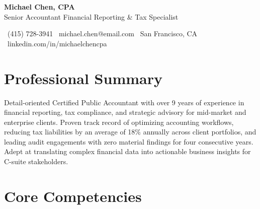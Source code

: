 \documentclass[11pt,letterpaper]{article}
\begin{document}

\vspace*{-0.15in}

\begin{center}
  \color{white}
  {\Huge\bfseries Michael Chen, CPA} \\[4pt]
  {\large Senior Accountant \textbar{} Financial Reporting \& Tax Specialist}
\end{center}

\vspace{0.1in}

\begin{center}
  \small
  \faPhone\ (415) 728-3941 \hspace{14pt}
  \faEnvelope\ michael.chen@email.com \hspace{14pt}
  \faMapMarker*\ San Francisco, CA \hspace{14pt}
  \faLinkedinIn\ linkedin.com/in/michaelchencpa
\end{center}

\vspace{2pt}

\section{Professional Summary}

Detail-oriented Certified Public Accountant with over 9 years of experience in financial reporting, tax compliance, and strategic advisory for mid-market and enterprise clients. Proven track record of optimizing accounting workflows, reducing tax liabilities by an average of 18\% annually across client portfolios, and leading audit engagements with zero material findings for four consecutive years. Adept at translating complex financial data into actionable business insights for C-suite stakeholders.

\section{Core Competencies}
\end{document}
